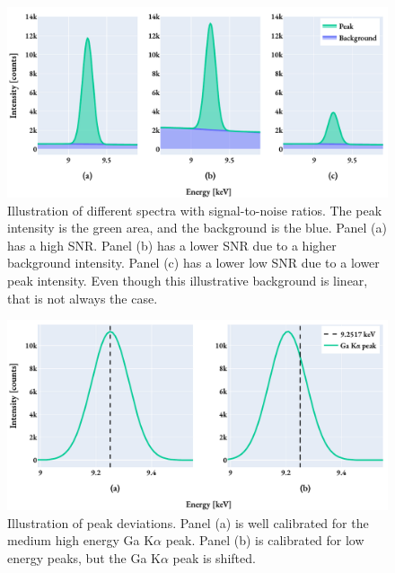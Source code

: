 \begin{figure}[htp]
    \centering
    \includegraphics[width=0.8\linewidth]{figures/pp_fiori_snr.pdf}
    \caption{
        Illustration of different spectra with signal-to-noise ratios.
        The peak intensity is the green area, and the background is the blue.
        Panel (a) has a high SNR.
        Panel (b) has a lower SNR due to a higher background intensity.
        Panel (c) has a lower low SNR due to a lower peak intensity.
        Even though this illustrative background is linear, that is not always the case.
    }
    \label{fig:theory:eds_performance:overview:fiori_snr}
\end{figure}


\begin{figure}[htp]
    \centering
    \includegraphics[width=0.8\linewidth]{figures/pp_peak_deviation.pdf}
    \caption{
        Illustration of peak deviations.
        Panel (a) is well calibrated for the medium high energy Ga K$\alpha$ peak.
        Panel (b) is calibrated for low energy peaks, but the Ga K$\alpha$ peak is shifted.
    }
    \label{fig:theory:eds_performance:overview:peak_deviations}
\end{figure}

